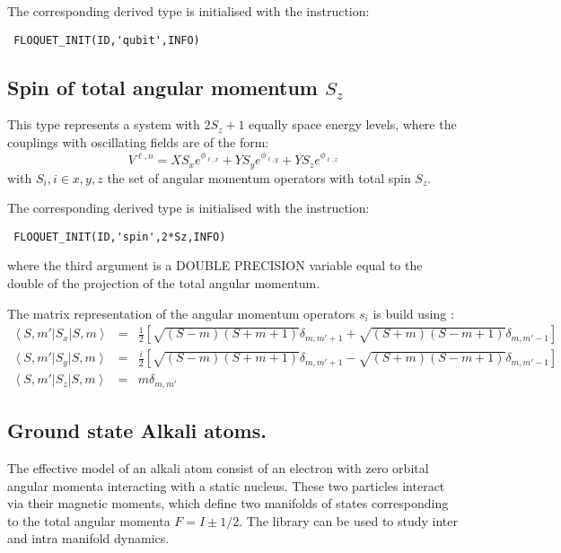 \documentclass[10pt,a4paper]{article}
\begin{document}
The corresponding derived type is initialised with the instruction: 
\begin{verbatim}
 FLOQUET_INIT(ID,'qubit',INFO)
\end{verbatim}

\subsection{Spin of total angular momentum $S_z$}
This type represents a system with $2 S_z + 1$ equally space energy levels, where the couplings with oscillating fields are of the form:
\begin{equation}
V^{\ell,n} = X S_x e^{\phi_{\ell,x}} +  Y S_y e^{\phi_{\ell,y}} + Y S_z e^{\phi_{\ell,z}}
\end{equation}
with $S_i, i\in{x,y,z}$ the set of  angular momentum operators with total spin $S_z$.

The corresponding derived type is initialised with the instruction:
\begin{verbatim}
 FLOQUET_INIT(ID,'spin',2*Sz,INFO) 
\end{verbatim}
where the third argument is a   DOUBLE   PRECISION   variable equal to the double of the projection of the total angular momentum.

The matrix representation of the angular momentum operators $s_i$ is build using \cite{sakurai1995modern}:
\begin{eqnarray}
\left\langle S, m'\right| S_x \left| S,m\right\rangle&=& \frac{1}{2} \left[\sqrt{(S-m)(S+m+1)}\delta_{m,m'+1} + \sqrt{(S+m)(S-m+1)}\delta_{m,m'-1} \right]  \label{eq:S_x}\\
\left\langle S, m'\right| S_y \left| S,m\right\rangle&=& \frac{i}{2} \left[\sqrt{(S-m)(S+m+1)}\delta_{m,m'+1} - \sqrt{(S+m)(S-m+1)}\delta_{m,m'-1} \right]  \label{eq:S_y}\\
\left\langle S, m'\right| S_z \left| S,m\right\rangle&=& m\delta_{m,m'} \label{eq:S_z} 
\end{eqnarray}

\subsection{Ground state Alkali atoms.}
The effective model of an alkali atom consist of an electron with zero orbital angular momenta interacting with a static nucleus. These two particles interact via their magnetic moments, which define two manifolds of states corresponding to the total angular momenta $F=I\pm1/2$. The library can be used to study inter and intra manifold dynamics.
\end{document}
